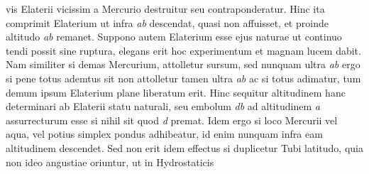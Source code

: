                  vis Elaterii\protect{} vicissim  a Mercurio\protect{} destruitur seu contraponderatur.\pend
                 \pstart
                 Hinc  ita comprimit Elaterium\protect{} ut infra \textit{ab} descendat, quasi  non affuisset, et proinde altitudo \textit{ab} remanet. Suppono  autem Elaterium\protect{} esse ejus naturae ut continuo tendi possit  sine ruptura, elegans erit hoc experimentum et magnam  lucem dabit. Nam similiter si demas Mercurium\protect{}, attolletur  sursum, sed nunquam ultra \textit{ab} ergo si pene totus  ademtus sit non attolletur tamen ultra \textit{ab} ac si totus adimatur, tum demum ipsum Elaterium\protect{} plane liberatum  erit. Hinc sequitur altitudinem hanc determinari ab Elaterii\protect{} statu naturali, seu embolum\protect{} \textit{db}  ad altitudinem \textit{a} assurrecturum esse si nihil  sit quod \textit{d} premat. Idem ergo si loco Mercurii\protect{} vel aqua,  vel potius simplex pondus\protect{} adhibeatur, id enim nunquam  infra eam altitudinem descendet. Sed non erit idem  effectus si duplicetur Tubi latitudo, quia non ideo  angustiae oriuntur, ut in Hydrostaticis\protect{} 
